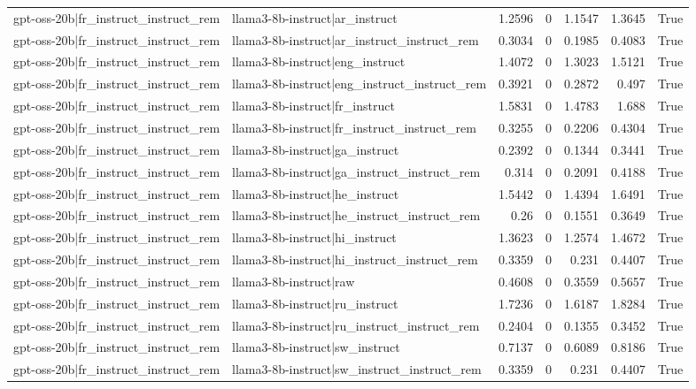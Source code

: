 \begin{table}
\begin{tabular}{l l r r r r l}
gpt-oss-20b|fr_instruct_instruct_rem & llama3-8b-instruct|ar_instruct & 1.2596 & 0 & 1.1547 & 1.3645 & True \\
gpt-oss-20b|fr_instruct_instruct_rem & llama3-8b-instruct|ar_instruct_instruct_rem & 0.3034 & 0 & 0.1985 & 0.4083 & True \\
gpt-oss-20b|fr_instruct_instruct_rem & llama3-8b-instruct|eng_instruct & 1.4072 & 0 & 1.3023 & 1.5121 & True \\
gpt-oss-20b|fr_instruct_instruct_rem & llama3-8b-instruct|eng_instruct_instruct_rem & 0.3921 & 0 & 0.2872 & 0.497 & True \\
gpt-oss-20b|fr_instruct_instruct_rem & llama3-8b-instruct|fr_instruct & 1.5831 & 0 & 1.4783 & 1.688 & True \\
gpt-oss-20b|fr_instruct_instruct_rem & llama3-8b-instruct|fr_instruct_instruct_rem & 0.3255 & 0 & 0.2206 & 0.4304 & True \\
gpt-oss-20b|fr_instruct_instruct_rem & llama3-8b-instruct|ga_instruct & 0.2392 & 0 & 0.1344 & 0.3441 & True \\
gpt-oss-20b|fr_instruct_instruct_rem & llama3-8b-instruct|ga_instruct_instruct_rem & 0.314 & 0 & 0.2091 & 0.4188 & True \\
gpt-oss-20b|fr_instruct_instruct_rem & llama3-8b-instruct|he_instruct & 1.5442 & 0 & 1.4394 & 1.6491 & True \\
gpt-oss-20b|fr_instruct_instruct_rem & llama3-8b-instruct|he_instruct_instruct_rem & 0.26 & 0 & 0.1551 & 0.3649 & True \\
gpt-oss-20b|fr_instruct_instruct_rem & llama3-8b-instruct|hi_instruct & 1.3623 & 0 & 1.2574 & 1.4672 & True \\
gpt-oss-20b|fr_instruct_instruct_rem & llama3-8b-instruct|hi_instruct_instruct_rem & 0.3359 & 0 & 0.231 & 0.4407 & True \\
gpt-oss-20b|fr_instruct_instruct_rem & llama3-8b-instruct|raw & 0.4608 & 0 & 0.3559 & 0.5657 & True \\
gpt-oss-20b|fr_instruct_instruct_rem & llama3-8b-instruct|ru_instruct & 1.7236 & 0 & 1.6187 & 1.8284 & True \\
gpt-oss-20b|fr_instruct_instruct_rem & llama3-8b-instruct|ru_instruct_instruct_rem & 0.2404 & 0 & 0.1355 & 0.3452 & True \\
gpt-oss-20b|fr_instruct_instruct_rem & llama3-8b-instruct|sw_instruct & 0.7137 & 0 & 0.6089 & 0.8186 & True \\
gpt-oss-20b|fr_instruct_instruct_rem & llama3-8b-instruct|sw_instruct_instruct_rem & 0.3359 & 0 & 0.231 & 0.4407 & True \\

\end{tabular}
\end{table}
